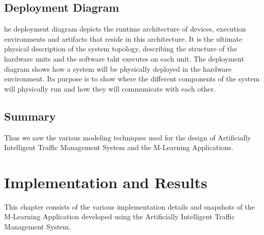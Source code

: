 \documentclass[openany,12pt]{report}
\begin{document}
\newpage
\section{Deployment Diagram}
\hspace*{0.5in}he deployment diagram depicts the runtime architecture of devices, execution environments and artifacts that reside in this architecture. It is the ultimate physical description of the system topology, describing the structure of the hardware units and the software taht executes on each unit. The deployment diagram shows how a system will be physically deployed in the hardware environment. Its purpose is to show where the different components of the system will physically run and how they will communicate with each other.

\section{Summary}
\hspace*{0.5in}Thus we saw the various modeling techniques used for the design of Artificially Intelligent Traffic Management System and the M-Learning Applications.

\chapter{Implementation and Results}
\hspace*{0.5in}This chapter consists of the various implementation details and snapshots of the M-Learning Application developed using the Artificially Intelligent Traffic Management System.
\end{document}
